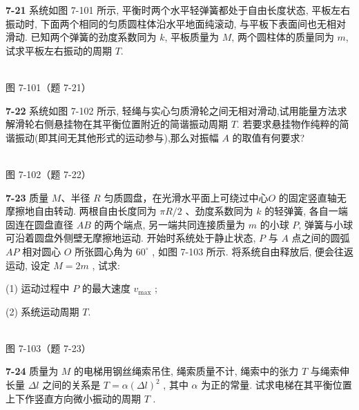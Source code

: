 \newpage

\textbf{7-21} 系统如图 7-101 所示, 平衡时两个水平轻弹簧都处于自由长度状态, 平板左右振动时, 下面两个相同的匀质圆柱体沿水平地面纯滚动, 与平板下表面间也无相对滑动. 已知两个弹簧的劲度系数同为 $k$, 平板质量为 $M$, 两个圆柱体的质量同为 $m$, 试求平板左右振动的周期 $T$.

\begin{center}
\resizebox{0.40\textwidth}{!}{}\\[4pt]
{\small 图 7-101（题 7-21）}
\end{center}

\newpage

\textbf{7-22} 系统如图 7-102 所示, 轻绳与实心匀质滑轮之间无相对滑动,试用能量方法求解滑轮右侧悬挂物在其平衡位置附近的简谐振动周期 $T$. 若要求悬挂物作纯粹的简谐振动(即其间无其他形式的运动参与),那么对振幅 $A$ 的取值有何要求?

\begin{center}
\resizebox{0.31\textwidth}{!}{}\\[4pt]
{\small 图 7-102（题 7-22）}
\end{center}

\newpage

\textbf{7-23} 质量 $M$、半径 $R$ 匀质圆盘，在光滑水平面上可绕过中心$O$ 的固定竖直轴无摩擦地自由转动. 两根自由长度同为 $\pi R/2$ 、劲度系数同为 $k$ 的轻弹簧, 各自一端固连在圆盘直径 $AB$ 的两个端点, 另一端共同连接质量为 $m$ 的小球 $P$, 弹簧与小球可沿着圆盘外侧壁无摩擦地运动. 开始时系统处于静止状态, $P$ 与 $A$ 点之间的圆弧 $AP$ 相对圆心 $O$ 所张圆心角为 $60^{\circ}$ , 如图 7-103 所示. 将系统自由释放后, 便会往返运动, 设定 $M = 2m$ , 试求:

(1) 运动过程中 $P$ 的最大速度 $v_{\max}$ ;

(2) 系统运动周期 $T$.

\begin{center}
\resizebox{0.44\textwidth}{!}{}\\[4pt]
{\small 图 7-103（题 7-23）}
\end{center}

\newpage

\textbf{7-24} 质量为 $M$ 的电梯用钢丝绳索吊住, 绳索质量不计, 绳索中的张力 $T$ 与绳索伸长量 $\Delta l$ 之间的关系是 $T = \alpha (\Delta l)^{2}$ , 其中 $\alpha$ 为正的常量. 试求电梯在其平衡位置上下作竖直方向微小振动的周期 $T$ .

